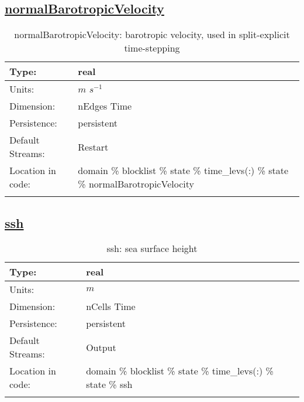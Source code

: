 \subsection[normalBarotropicVelocity]{\hyperref[sec:var_tab_state]{normalBarotropicVelocity}}
\label{subsec:var_sec_state_normalBarotropicVelocity}
\begin{center}
\begin{longtable}{| p{2.0in} | p{4.0in} |}
        \hline 
        Type: & real \\
        \hline 
        Units: & $m$ $s^{-1}$ \\
        \hline 
        Dimension: & nEdges Time \\
        \hline 
        Persistence: & persistent \\
        \hline 
		 Default Streams: & Restart  \\
        \hline 
		 Location in code: & domain \% blocklist \% state \% time\_levs(:) \% state \% normalBarotropicVelocity \\
		 \hline 
    \caption{normalBarotropicVelocity: barotropic velocity, used in split-explicit time-stepping}
\end{longtable}
\end{center}
\subsection[ssh]{\hyperref[sec:var_tab_state]{ssh}}
\label{subsec:var_sec_state_ssh}
\begin{center}
\begin{longtable}{| p{2.0in} | p{4.0in} |}
        \hline 
        Type: & real \\
        \hline 
        Units: & $m$ \\
        \hline 
        Dimension: & nCells Time \\
        \hline 
        Persistence: & persistent \\
        \hline 
		 Default Streams: & Output  \\
        \hline 
		 Location in code: & domain \% blocklist \% state \% time\_levs(:) \% state \% ssh \\
		 \hline 
    \caption{ssh: sea surface height}
\end{longtable}
\end{center}
